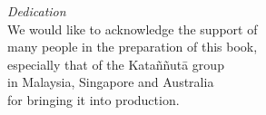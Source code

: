 
\cleartorecto
\thispagestyle{empty}

\vspace*{10mm}

{\centering
\small

\textit{Dedication}\\[0.4\baselineskip]
We would like to acknowledge the support of\\
many people in the preparation of this book,\\
especially that of the Kataññutā group\\
in Malaysia, Singapore and Australia\\
for bringing it into production.

}

